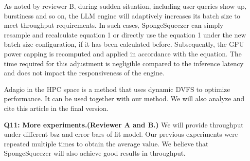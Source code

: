 As noted by reviewer B, during sudden situation, including user queries show up, burstiness and so on, the LLM engine will adaptively increases its batch size to meet throughput requirements.
In such cases, SpongeSqueezer can simply resample and recalculate equation 1 or directly use the equation 1 under the new batch size configuration, if it has been calculated before. 
Subsequently, the GPU power capping is recomputed and applied in accordance with the equation.
The time required for this adjustment is negligible compared to the inference latency and does not impact the responsiveness of the engine.

Adagio in the HPC space is a method that uses dynamic DVFS to optimize performance. 
It can be used together with our method. We will also analyze and cite this article in the final version.


\textbf{Q11: More experiments.(Reviewer A and B.)}
We will provide throughput under different bsz and error bars of fit model.
Our previous experiments were repeated multiple times to obtain the average value. 
We believe that SpongeSqueezer will also achieve good results in throughput.















